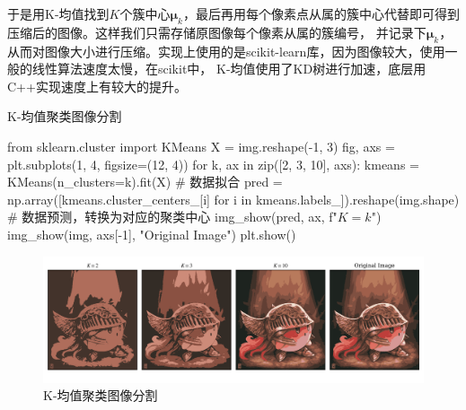 \documentclass[12pt, a4paper, oneside]{ctexart}
\def\bd{\boldsymbol}        %
\begin{document}
于是用K-均值找到$K$个簇中心$\bd{\mu}_k$，最后再用每个像素点从属的簇中心代替即可得到压缩后的图像。这样我们只需存储原图像每个像素从属的簇编号，
并记录下$\bd{\mu}_k$，从而对图像大小进行压缩。实现上使用的是scikit-learn库，因为图像较大，使用一般的线性算法速度太慢，在scikit中，
K-均值使用了KD树进行加速，底层用C++实现速度上有较大的提升。
\begin{algorithm}
    \caption{K-均值聚类图像分割}
    \begin{pythoncode}
from sklearn.cluster import KMeans
X = img.reshape(-1, 3)
fig, axs = plt.subplots(1, 4, figsize=(12, 4))
for k, ax in zip([2, 3, 10], axs):
    kmeans = KMeans(n_clusters=k).fit(X)  # 数据拟合
    pred = np.array([kmeans.cluster_centers_[i] for i in kmeans.labels_]).reshape(img.shape)  # 数据预测，转换为对应的聚类中心
    img_show(pred, ax, f"$K={k}$")
img_show(img, axs[-1], "Original Image")
plt.show()
    \end{pythoncode}
\end{algorithm}
\begin{figure}[H]
    \vspace{-0.5cm}
    \hspace{-2cm}
    \includegraphics[scale=0.65]{./code/figures/image_segmentation/kmeans_image_segmentation.png}
    \caption{K-均值聚类图像分割}
\end{figure}
\end{document}
